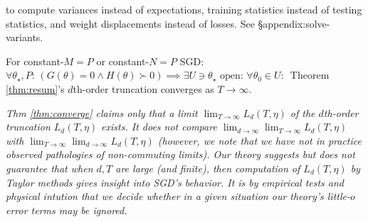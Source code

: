 {\begin{rmk}
{                to compute variances instead of expectations, training
                statistics instead of testing statistics, and weight
                displacements instead of losses.  See \S{appendix:solve-variants}.}\mend
            \end{rmk}
            \begin{thm} \label{thm:converge}
                For constant-$M=P$ or constant-$N=P$ SGD:
                $\forall \theta_\star,P:\, (G(\theta)=0 \wedge H(\theta)\succ
                0) \implies \exists U\ni \theta_\star\,\,\text{open}:\, \forall
                \theta_0\in U:\,$
                Theorem \ref{thm:resum}'s $d$th-order truncation converges
                as $T\to \infty$.
            \end{thm}
            \begin{rmk}
                \emph{
                Thm \ref{thm:converge} claims only that a limit
                $\lim_{T\to\infty} L_d(T,\eta)$ of the
                $d$th-order truncation $L_d(T,\eta)$ exists.
                It does not compare $\lim_{d\to\infty}
                \lim_{T\to\infty} L_d(T,\eta)$ with $\lim_{T\to\infty}
                \lim_{d\to\infty} L_d(T,\eta)$ (however, we note that we have not in practice
                observed pathologies of non-commuting limits).
                Our theory suggests but does not guarantee that when $d, T$ are
                large (and finite), then computation of $L_d(T,\eta)$ by Taylor
                methods gives insight into SGD's behavior.  It is by empirical
                tests and physical intution that we decide whether in a given
                situation our theory's little-$o$ error terms may be ignored. 
                }
            \end{rmk}

}
